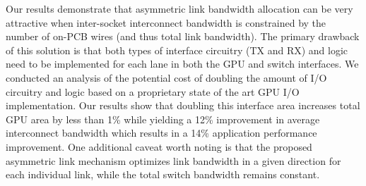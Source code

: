 Our results demonstrate that asymmetric link bandwidth
allocation can be very attractive when inter-socket interconnect bandwidth is constrained 
by the number of on-PCB wires (and thus total link bandwidth).
The primary drawback of this solution is that both types of interface circuitry (TX and RX)
and logic need to be implemented for each lane in both the GPU and switch interfaces.
We conducted an analysis of the potential cost of doubling the amount
of I/O circuitry and logic based on a proprietary state of
the art GPU I/O implementation. Our results show that doubling this interface area
increases total GPU area by less than 1\% while yielding a 12\% improvement in average
interconnect bandwidth which results in a 14\% application performance improvement.  
One additional caveat worth noting is that the proposed asymmetric link
mechanism optimizes link bandwidth in a given direction for each individual
link, while the total switch bandwidth remains constant.
 




